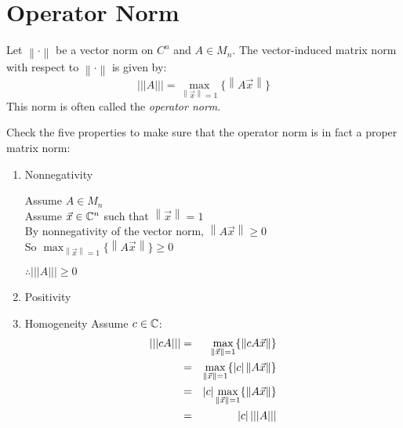 \documentclass[letterpaper,12pt,fleqn]{article}
\newcommand{\norm}[1]{\left\lVert#1\right\rVert}
\newcommand{\mnorm}[1]{\left\lvert\left\lvert\left\lvert#1
  \right\rvert\right\rvert\right\rvert}
\newcommand{\vx}{\vec{x}}
\newcommand{\vy}{\vec{y}}
\newcommand{\vz}{\vec{0}}
\begin{document}
\section*{Operator Norm}

\begin{definition}
  Let $\norm{\cdot}$ be a vector norm on $C^n$ and $A\in M_n$. The
  vector-induced matrix norm with respect to $\norm{\cdot}$ is given by:
  \[\mnorm{A}=\max_{\norm{\vx}=1}\{\norm{A\vx}\}\]
  This norm is often called the \emph{operator norm}.
\end{definition}

Check the five properties to make sure that the operator norm is in fact a
proper matrix norm:
\begin{enumerate}
\item Nonnegativity

  Assume $A\in M_n$ \\
  Assume $\vx\in\C^n$ such that $\norm{\vx}=1$ \\
  By nonnegativity of the vector norm, $\norm{A\vx}\ge0$ \\
  So $\max_{\norm{\vx}=1}\{\norm{A\vx}\}\ge0$
  
  $\therefore\mnorm{A}\ge0$

\item Positivity

\item Homogeneity
  Assume $c\in\mathbb{C}$:
  \begin{eqnarray*}
    \mnorm{cA} &=& \max_{\norm{\vx}=1}\{\norm{cA\vx}\} \\
    &=& \max_{\norm{\vx}=1}\{\abs{c}\norm{A\vx}\} \\
    &=& \abs{c}\max_{\norm{\vx}=1}\{\norm{A\vx}\} \\
    &=& \abs{c}\mnorm{A}
  \end{eqnarray*}


\end{enumerate}
\end{document}
